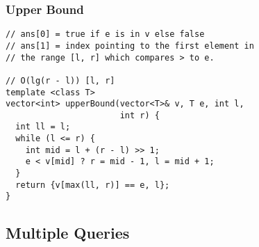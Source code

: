 \documentclass[twoside]{article}
\begin{document}
\begin{multicols*}{2}
\subsubsection*{Upper Bound}
\begin{verbatim}
// ans[0] = true if e is in v else false
// ans[1] = index pointing to the first element in
// the range [l, r] which compares > to e.

// O(lg(r - l)) [l, r]
template <class T>
vector<int> upperBound(vector<T>& v, T e, int l,
                       int r) {
  int ll = l;
  while (l <= r) {
    int mid = l + (r - l) >> 1;
    e < v[mid] ? r = mid - 1, l = mid + 1;
  }
  return {v[max(ll, r)] == e, l};
}
\end{verbatim}

\subsectionfont{\bfseries\sffamily\centering\LARGE}
\vspace{0em}
\subsection*{Multiple Queries}
\vspace{2em}
\subsubsectionfont{\large\bfseries\sffamily\underline}

\end{multicols*}
\end{document}
